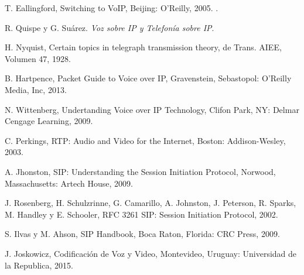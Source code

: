 \documentclass[12pt,oneside, letterpaper]{book}
\begin{document}

	\begin{thebibliography}{15}
		T. Eallingford, Switching to VoIP, Beijing: O'Reilly, 2005. .
		
		R. Quispe y G. Suárez.	
		\textit{ Voz sobre IP y Telefonía sobre IP}.
		
		H. Nyquist, Certain topics in telegraph transmission theory, de Trans. AIEE, Volumen 47, 1928.
		
		B. Hartpence, Packet Guide to Voice over IP, Gravenstein, Sebastopol: O'Reilly Media, Inc, 2013. 
		
		N. Wittenberg, Undertanding Voice over IP Technology, Clifon Park, NY: Delmar Cengage Learning, 2009.
		
		C. Perkings, RTP: Audio and Video for the Internet, Boston: Addison-Wesley, 2003.
		
		A. Jhonston, SIP: Understanding the Session Initiation Protocol, Norwood, Massachusetts: Artech House, 2009.
		
		J. Rosenberg, H. Schulzrinne, G. Camarillo, A. Johnston, J. Peterson, R. Sparks, M. Handley y E. Schooler, RFC 3261 SIP: Session Initiation Protocol, 2002. 
		
		S. Ilvas y M. Ahson, SIP Handbook, Boca Raton, Florida: CRC Press, 2009.
		
		J. Joskowicz, Codificación de Voz y Video, Montevideo, Uruguay: Universidad de la Republica, 2015.
		
	\end{thebibliography}
\end{document}
